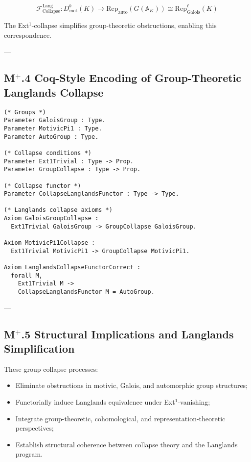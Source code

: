 \documentclass[11pt]{article}
\begin{document}
\[
\mathcal{F}_{\mathrm{Collapse}}^{\mathrm{Lang}} : D^b_{\mathrm{mot}}(K) \longrightarrow \mathrm{Rep}_{\mathrm{auto}}(G(\mathbb{A}_K)) \cong \mathrm{Rep}_{\mathrm{Galois}}^\ell(K)
\]

The Ext$^1$-collapse simplifies group-theoretic obstructions, enabling this correspondence.

---

\subsection*{M$^{+}$.4 Coq-Style Encoding of Group-Theoretic Langlands Collapse}

\begin{lstlisting}[language=Coq]
(* Groups *)
Parameter GaloisGroup : Type.
Parameter MotivicPi1 : Type.
Parameter AutoGroup : Type.

(* Collapse conditions *)
Parameter Ext1Trivial : Type -> Prop.
Parameter GroupCollapse : Type -> Prop.

(* Collapse functor *)
Parameter CollapseLanglandsFunctor : Type -> Type.

(* Langlands collapse axioms *)
Axiom GaloisGroupCollapse :
  Ext1Trivial GaloisGroup -> GroupCollapse GaloisGroup.

Axiom MotivicPi1Collapse :
  Ext1Trivial MotivicPi1 -> GroupCollapse MotivicPi1.

Axiom LanglandsCollapseFunctorCorrect :
  forall M,
    Ext1Trivial M ->
    CollapseLanglandsFunctor M = AutoGroup.
\end{lstlisting}

---

\subsection*{M$^{+}$.5 Structural Implications and Langlands Simplification}

These group collapse processes:

\begin{itemize}
    \item Eliminate obstructions in motivic, Galois, and automorphic group structures;
    \item Functorially induce Langlands equivalence under Ext$^1$-vanishing;
    \item Integrate group-theoretic, cohomological, and representation-theoretic perspectives;
    \item Establish structural coherence between collapse theory and the Langlands program.
\end{itemize}
\end{document}
